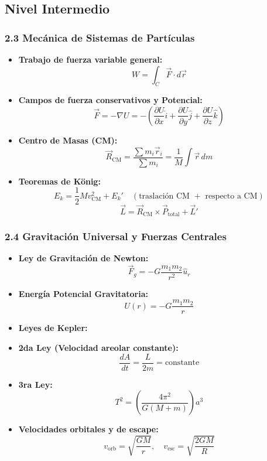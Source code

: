 \documentclass[11pt,a4paper]{article}
\begin{document}
\subsection*{Nivel Intermedio}

\subsubsection*{2.3 Mecánica de Sistemas de Partículas}

\begin{itemize}
  \item \textbf{Trabajo de fuerza variable general:}
  \[
    W = \int_{C} \vec{F} \cdot d\vec{r}
  \]
  \item \textbf{Campos de fuerza conservativos y Potencial:}
  \[
    \vec{F} = -\nabla U = -\left( \frac{\partial U}{\partial x}\hat{i} + \frac{\partial U}{\partial y}\hat{j} + \frac{\partial U}{\partial z}\hat{k} \right)
  \]
  \item \textbf{Centro de Masas (CM):}
  \[
    \vec{R}_{\text{CM}} = \frac{\sum m_i \vec{r}_i}{\sum m_i} = \frac{1}{M}\int \vec{r} \, dm
  \]
  \item \textbf{Teoremas de König:}
  \[
    E_k = \frac{1}{2} M v_{\text{CM}}^2 + E_k' \quad (\text{traslación CM } + \text{ respecto a CM})
  \]
  \[
    \vec{L} = \vec{R}_{\text{CM}} \times \vec{P}_{\text{total}} + \vec{L}'
  \]
\end{itemize}

\subsubsection*{2.4 Gravitación Universal y Fuerzas Centrales}

\begin{itemize}
  \item \textbf{Ley de Gravitación de Newton:}
  \[
    \vec{F}_g = -G \frac{m_1 m_2}{r^2} \hat{u}_r
  \]
  \item \textbf{Energía Potencial Gravitatoria:}
  \[
    U(r) = -G \frac{m_1 m_2}{r}
  \]
  \item \textbf{Leyes de Kepler:}
  \item \textbf{2da Ley (Velocidad areolar constante):}
  \[
    \frac{dA}{dt} = \frac{L}{2m} = \text{constante}
  \]
  \item \textbf{3ra Ley:}
  \[
    T^2 = \left( \frac{4\pi^2}{G(M + m)} \right) a^3
  \]
  \item \textbf{Velocidades orbitales y de escape:}
  \[
    v_{\text{orb}} = \sqrt{\frac{GM}{r}}, \quad v_{\text{esc}} = \sqrt{\frac{2GM}{R}}
  \]
\end{itemize}
\end{document}
